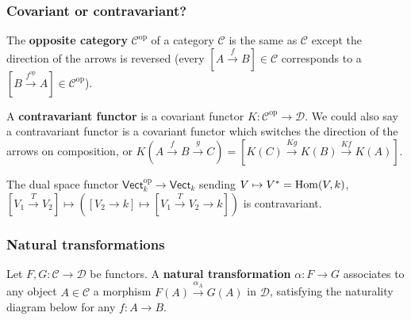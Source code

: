 \documentclass[xcolor=dvipsnames]{beamer}
\begin{document}
    \begin{frame}
        \frametitle{Covariant or contravariant?} 
        \begin{definition}[]
            The \textbf{opposite category} $\mathcal{C} ^{\mathrm{op}}$ of a category $\mathcal{C} $ is the same as $\mathcal{C} $ except the direction of the arrows is reversed (every $[A \xrightarrow f B] \in \mathcal{C} $ corresponds to a $[B \xrightarrow{f ^{\mathrm{op}}} A] \in \mathcal{C} ^{\mathrm{op}}$).
        \end{definition}
        \begin{definition}[]
 A \textbf{contravariant functor} is a covariant functor $K \colon \mathcal{C} ^{\mathrm{op}} \to \mathcal{D} $.
 We could also say a contravariant functor is a covariant functor which switches the direction of the arrows on composition, or $K(A \xrightarrow f B \xrightarrow g C) =[K(C)\xrightarrow{Kg} K(B) \xrightarrow{Kf} K(A)]$. 
        \end{definition}
        \begin{example}
            The dual space functor $\mathsf{Vect} _k^{\mathrm{op}} \to \mathsf{Vect} _k$ sending $V \mapsto  V^*=\operatorname{Hom}(V,k)$, $[ V_1 \xrightarrow T V_2 ]\mapsto ([V_2 \to k] \mapsto [V_1 \xrightarrow TV_2 \to k])$ is contravariant.
        \end{example}
    \end{frame}
    \begin{frame}[fragile]
        \frametitle{Natural transformations} 
        \begin{definition}[]
        Let $F,G \colon \mathcal{C}  \to \mathcal{D} $ be functors. A \textbf{natural transformation}  $\alpha  \colon F \to G$ associates to any object $A \in \mathcal{C} $ a morphism $F(A) \xrightarrow{\alpha _A}  G(A) $ in $\mathcal{D} $, satisfying the naturality diagram below for any $f \colon A \to B$.
                \begin{figure}[H]
        \end{figure}
        \end{definition}
    \end{frame}
\end{document}

